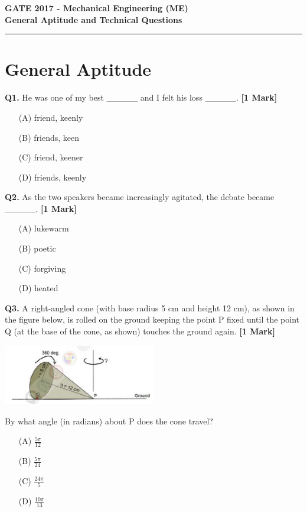 \documentclass[11pt]{article}
\newcommand{\questiona}[2]{
    \noindent\textbf{Q#2.} #1 \hfill \textbf{[1 Mark]}
}
\begin{document}
\begin{center}
    \Large\textbf{GATE 2017 - Mechanical Engineering (ME)} \\
    \large\textbf{General Aptitude and Technical Questions} \\
    \rule{\textwidth}{0.5pt} %
\end{center}

\vspace{0.5cm}

\section*{General Aptitude}

\questiona{He was one of my best \_\_\_\_\_ and I felt his loss \_\_\_\_\_.}{1}
\begin{enumerate}
    \item[(A)] friend, keenly  
    \item[(B)] friends, keen  
    \item[(C)] friend, keener  
    \item[(D)] friends, keenly  
\end{enumerate}
\vspace{0.5cm}

\questiona{As the two speakers became increasingly agitated, the debate became \_\_\_\_\_.}{2}
\begin{enumerate}
    \item[(A)] lukewarm  
    \item[(B)] poetic  
    \item[(C)] forgiving  
    \item[(D)] heated  
\end{enumerate}
\vspace{0.5cm}

\questiona{A right-angled cone (with base radius 5 cm and height 12 cm), as shown in the figure below, is rolled on the ground keeping the point P fixed until the point Q (at the base of the cone, as shown) touches the ground again.}{3}
\begin{center}
\includegraphics[width=0.5\textwidth]{figures/3.png}
\end{center}
By what angle (in radians) about P does the cone travel?
\begin{enumerate}
    \item[(A)] $\frac{5\pi}{12}$  
    \item[(B)] $\frac{5\pi}{24}$  
    \item[(C)] $\frac{24\pi}{5}$  
    \item[(D)] $\frac{10\pi}{13}$  
\end{enumerate}
\vspace{0.5cm}
\end{document}
